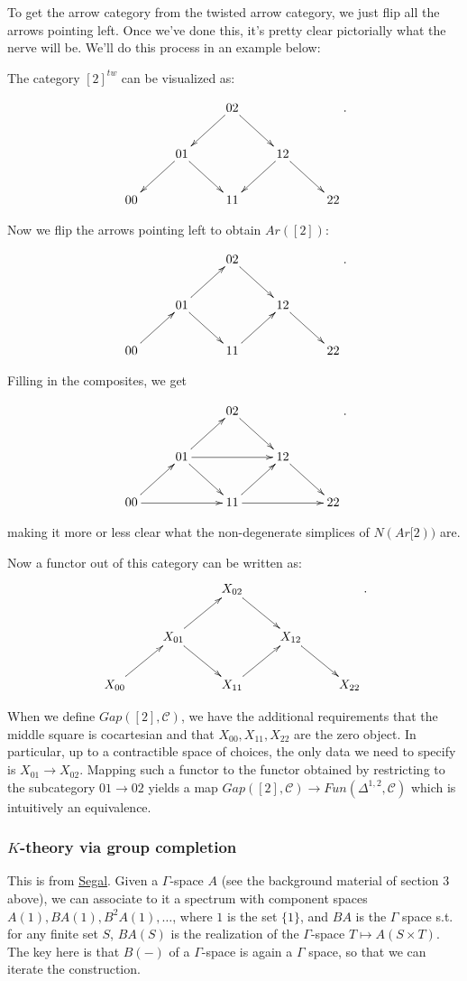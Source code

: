 \documentclass[letterpaper]{article}
\theoremstyle{definition}
\newcommand{\mc}{\mathcal}
\begin{document}
To get the arrow category from the twisted arrow category, we just
flip all the arrows pointing left. Once we've done this, it's pretty
clear pictorially what the nerve will be. We'll do this process in an
example below:

The category $[2]^{tw}$ can be visualized as:

\[
\xymatrix{ & & 02 \ar[dr] \ar[dl] & & \\ & 01 \ar[dl] \ar[dr]& &12
  \ar[dr]\ar[dl] & \\ 00& & 11& & 22}.
\]

Now we flip the arrows pointing left to obtain $Ar([2])$:


\[
\xymatrix{ & & 02 \ar[dr]  & & \\ & 01 \ar[ur] \ar[dr]& &12
  \ar[dr] & \\ 00 \ar[ur] & & 11 \ar[ur]& & 22}.
\]

Filling in the composites, we get

\[
\xymatrix{ & & 02 \ar[dr]  & & \\ & 01 \ar[rr]\ar[ur] \ar[dr]& &12
  \ar[dr] & \\ 00 \ar[rr] \ar[ur] & & 11 \ar[rr] \ar[ur]& & 22}.
\]

making it more or less clear what the non-degenerate simplices of
$N(Ar[2))$ are. 

Now a functor out of this category can be written as: 
\[
\xymatrix{ & & X_{02} \ar[dr]  & & \\ & X_{01} \ar[ur] \ar[dr]& & X_{12}
  \ar[dr] & \\ X_{00} \ar[ur] & & X_{11} \ar[ur]& & X_{22}}.
\]

When we define $Gap([2],\mc C)$, we have the additional requirements
that the middle square is cocartesian and that $X_{00},X_{11},X_{22}$
are the zero object. In particular, up to a contractible space of
choices, the only data we need to specify
is $X_{01} \rightarrow X_{02}$. Mapping such a functor to the functor
obtained by restricting to the subcategory $01 \rightarrow 02$ yields
a map $Gap([2],\mc C) \rightarrow Fun(\Delta^{1,2},\mc C)$ which is
intuitively an equivalence. 

\subsubsection{$K$-theory via group completion}

This is from
\href{References/CategoriesAndCohomologyTheories.pdf}{Segal}. Given a
$\Gamma$-space $A$ (see the background material of section 3 above), we
can associate to it a spectrum with component spaces $A(1), BA(1),
B^2A(1), \dots $, where $1$ is the set $\{1\}$, and $BA$ is the
$\Gamma$ space s.t. for any finite set $S$, $BA(S)$ is the realization
of the $\Gamma$-space $T \mapsto A(S \times T)$. The key here is that
$B(-)$ of a $\Gamma$-space is again a $\Gamma$ space, so that we can
iterate the construction. 
\end{document}
